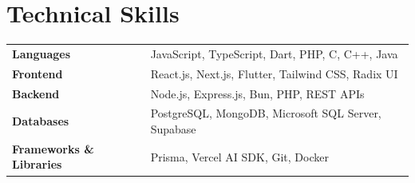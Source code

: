 \documentclass[10pt,a4paper]{article}
\begin{document}
\section{Technical Skills}

\vspace{-1pt}

\begin{tabularx}{\textwidth}{
    @{}
    >{\bfseries}p{12.5em}
    >{\raggedright\arraybackslash}X
    @{}
}
Languages & JavaScript, TypeScript, Dart, PHP, C, C++, Java \\[1pt]
Frontend & React.js, Next.js, Flutter, Tailwind CSS, Radix UI \\[1pt]
Backend & Node.js, Express.js, Bun, PHP, REST APIs \\[1pt]
Databases & PostgreSQL, MongoDB, Microsoft SQL Server, Supabase \\[1pt]
Frameworks \& Libraries & Prisma, Vercel AI SDK, Git, Docker
\end{tabularx}
\end{document}
